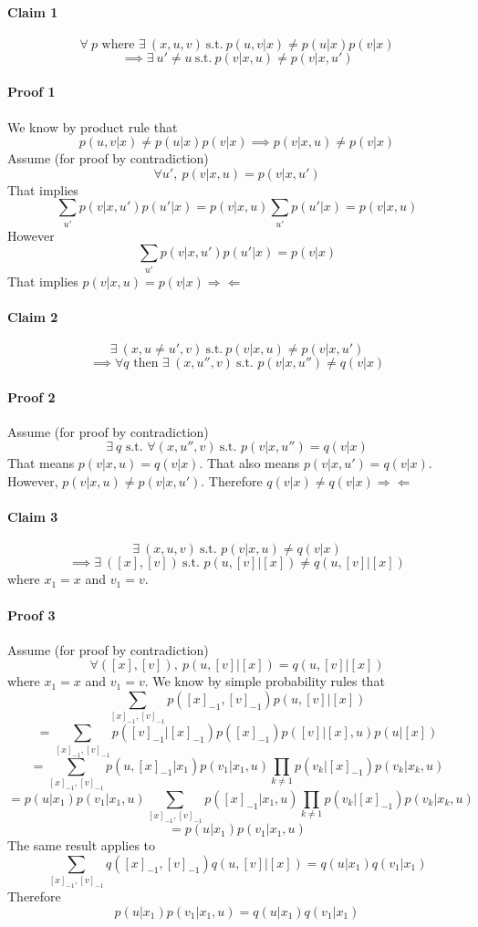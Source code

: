 \documentclass{article}
\begin{document}
\paragraph{Claim 1} $$\forall ~ p \textrm{ where } \exists ~ (x, u, v) ~\textrm {s.t.}~ p(u, v | x) \neq p(u | x) p(v | x)$$ $$\implies \exists ~ u' \neq u ~ \textrm{s.t.} ~ p(v | x, u) \neq p(v | x, u')$$

\paragraph{Proof 1} We know by product rule that $$p(u, v | x) \neq p(u | x) p(v | x) \implies p(v | x, u) \neq p(v | x)$$ Assume (for proof by contradiction) $$\forall u', ~ p(v | x, u) = p(v | x, u')$$ That implies $$\sum_{u'} p(v|x,u') p(u'|x) = p(v|x,u) \sum_{u'}p(u'|x) = p(v|x,u)$$ However $$\sum_{u'} p(v|x,u') p(u'|x) = p(v | x)$$ That implies $p(v | x, u) = p(v | x) \Rightarrow\!\Leftarrow$

\paragraph{Claim 2} $$\exists ~ (x, u \neq u', v) ~ \textrm{s.t.}~  p(v | x, u) \neq p(v | x, u')$$ $$\implies \forall q \textrm{ then } \exists ~ (x, u'', v) ~ \textrm{s.t. } p(v | x, u'') \neq q(v | x)$$

\paragraph{Proof 2} Assume (for proof by contradiction) $$\exists ~ q \textrm{ s.t. } \forall (x, u'', v) ~ \textrm{s.t. } p(v | x, u'') = q(v | x)$$ That means $p(v | x, u) = q(v | x)$. That also means $p(v | x, u') = q(v | x)$. However, $p(v | x, u) \neq p(v | x, u')$. Therefore $q(v | x) \neq q(v | x) \Rightarrow\!\Leftarrow$

\paragraph{Claim 3} $$\exists ~ (x, u, v) ~ \textrm{s.t. } p(v | x, u) \neq q(v | x)$$ $$\implies \exists ~ ([x], [v]) ~ \textrm{s.t. } p(u, [v] | [x]) \neq q(u, [v] | [x])$$ where $x_1 = x$ and $v_1 = v$.

\paragraph{Proof 3} Assume (for proof by contradiction) $$\forall ([x], [v]), ~ p(u, [v] | [x]) = q(u, [v] | [x])$$ where $x_1 = x$ and $v_1 = v$. We know by simple probability rules that $$\sum_{[x]_{-1}, [v]_{-1}} p([x]_{-1}, [v]_{-1}) p(u, [v] | [x])$$ $$= \sum_{[x]_{-1}, [v]_{-1}} p([v]_{-1} | [x]_{-1}) p([x]_{-1}) p([v] | [x], u) p(u | [x])$$ $$= \sum_{[x]_{-1}, [v]_{-1}} p(u, [x]_{-1}| x_1) p(v_1 | x_1, u) \prod_{k \neq 1} p(v_k | [x]_{-1}) p(v_k | x_k, u)$$ $$= p(u | x_1) p(v_1 | x_1, u) \sum_{[x]_{-1}, [v]_{-1}} p([x]_{-1}| x_1, u) \prod_{k \neq 1} p(v_k | [x]_{-1}) p(v_k|x_k,u)$$ $$= p(u|x_1) p(v_1|x_1,u)$$ The same result applies to $$\sum_{[x]_{-1}, [v]_{-1}} q([x]_{-1},[v]_{-1}) q(u,[v]|[x]) = q(u|x_1) q(v_1|x_1)$$ Therefore $$p(u|x_1) p(v_1|x_1,u) = q(u|x_1) q(v_1|x_1)$$ 
\end{document}
